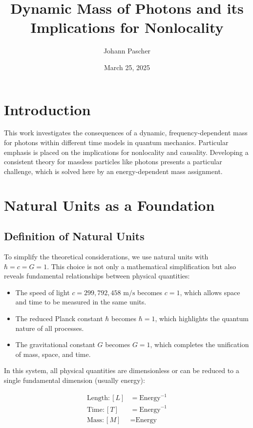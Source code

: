 \documentclass[a4paper,12pt]{article}
\begin{document}
	
	\title{Dynamic Mass of Photons and its Implications for Nonlocality}
	\author{Johann Pascher}
	\date{March 25, 2025}
	\maketitle
	
	\tableofcontents %
	\newpage %
	
	\section{Introduction}
	This work investigates the consequences of a dynamic, frequency-dependent mass for photons within different time models in quantum mechanics. Particular emphasis is placed on the implications for nonlocality and causality. Developing a consistent theory for massless particles like photons presents a particular challenge, which is solved here by an energy-dependent mass assignment.
	
	\section{Natural Units as a Foundation}
	\subsection{Definition of Natural Units}
	To simplify the theoretical considerations, we use natural units with $\hbar = c = G = 1$. This choice is not only a mathematical simplification but also reveals fundamental relationships between physical quantities:
	
	\begin{itemize}
		\item The speed of light $c = 299,792,458 \text{ m/s}$ becomes $c = 1$, which allows space and time to be measured in the same units.
		\item The reduced Planck constant $\hbar$ becomes $\hbar = 1$, which highlights the quantum nature of all processes.
		\item The gravitational constant $G$ becomes $G = 1$, which completes the unification of mass, space, and time.
	\end{itemize}
	
	In this system, all physical quantities are dimensionless or can be reduced to a single fundamental dimension (usually energy):
	
	\begin{align}
		\text{Length}: [L] &= \text{Energy}^{-1} \\
		\text{Time}: [T] &= \text{Energy}^{-1} \\
		\text{Mass}: [M] &= \text{Energy}
	\end{align}
	
\end{document}
